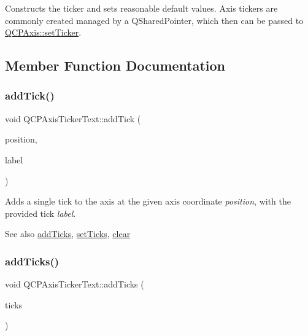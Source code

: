 Constructs the ticker and sets reasonable default values. Axis tickers are commonly created managed by a Q\+Shared\+Pointer, which then can be passed to \mbox{\hyperlink{class_q_c_p_axis_a4ee03fcd2c74d05cd1a419b9af5cfbdc}{Q\+C\+P\+Axis\+::set\+Ticker}}. 

\subsection{Member Function Documentation}
\mbox{\label{class_q_c_p_axis_ticker_text_aada3db69e5fc6585aaa4ea5d89552eb0}} 
\subsubsection{\texorpdfstring{addTick()}{addTick()}}
{\footnotesize\ttfamily void Q\+C\+P\+Axis\+Ticker\+Text\+::add\+Tick (\begin{DoxyParamCaption}\item[{double}]{position,  }\item[{Q\+String}]{label }\end{DoxyParamCaption})}

Adds a single tick to the axis at the given axis coordinate {\itshape position}, with the provided tick {\itshape label}.

\begin{DoxySeeAlso}{See also}
\mbox{\hyperlink{class_q_c_p_axis_ticker_text_aba34051300eecaefbedb2df8feff2d45}{add\+Ticks}}, \mbox{\hyperlink{class_q_c_p_axis_ticker_text_a8cdf1f21940f1f53f5e3d30b2c74f5cf}{set\+Ticks}}, \mbox{\hyperlink{class_q_c_p_axis_ticker_text_a21826d2fcd9a25c194d34d4f67aa1460}{clear}} 
\end{DoxySeeAlso}
\mbox{\label{class_q_c_p_axis_ticker_text_aba34051300eecaefbedb2df8feff2d45}} 
\subsubsection{\texorpdfstring{addTicks()}{addTicks()}\hspace{0.1cm}{\footnotesize\ttfamily [1/2]}}
{\footnotesize\ttfamily void Q\+C\+P\+Axis\+Ticker\+Text\+::add\+Ticks (\begin{DoxyParamCaption}\item[{const Q\+Map$<$ double, Q\+String $>$ \&}]{ticks }\end{DoxyParamCaption})}

